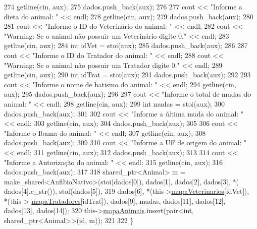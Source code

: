\begin{DoxyCode}
274         getline(cin, aux);
275         dados.push\_back(aux);
276 
277         cout << \textcolor{stringliteral}{"Informe a dieta do animal: "} << endl;
278         getline(cin, aux);
279         dados.push\_back(aux);
280 
281         cout << \textcolor{stringliteral}{"Informe o ID do Veterinário do animal: "} << endl;
282         cout << \textcolor{stringliteral}{"Warning: Se o animal não possuir um Veterinário digite 0."} << endl;
283         getline(cin, aux);
284         \textcolor{keywordtype}{int} idVet = stoi(aux);
285         dados.push\_back(aux);
286 
287         cout << \textcolor{stringliteral}{"Informe o ID do Tratador do animal: "} << endl;
288         cout << \textcolor{stringliteral}{"Warning: Se o animal não possuir um Tratador digite 0."} << endl;
289         getline(cin, aux);
290         \textcolor{keywordtype}{int} idTrat = stoi(aux);
291         dados.push\_back(aux);
292 
293         cout << \textcolor{stringliteral}{"Informe o nome de batismo do animal: "} << endl;
294         getline(cin, aux);
295         dados.push\_back(aux);
296 
297         cout << \textcolor{stringliteral}{"Informe o total de mudas do animal: "} << endl;
298         getline(cin, aux);
299         \textcolor{keywordtype}{int} mudas = stoi(aux);
300         dados.push\_back(aux);
301 
302         cout << \textcolor{stringliteral}{"Informe a última muda do animal: "} << endl;
303         getline(cin, aux);
304         dados.push\_back(aux);
305 
306         cout << \textcolor{stringliteral}{"Informe o Ibama do animal: "} << endl;
307         getline(cin, aux);
308         dados.push\_back(aux);
309 
310         cout << \textcolor{stringliteral}{"Informe a UF de origem do animal: "} << endl;
311         getline(cin, aux);
312         dados.push\_back(aux);
313 
314         cout << \textcolor{stringliteral}{"Informe a Autorização do animal: "} << endl;
315         getline(cin, aux);
316         dados.push\_back(aux);
317 
318         shared\_ptr<Animal> m = make\_shared<AnfibioNativo>(stoi(dados[0]), dados[1], dados[2], dados[3], *(
      dados[4].c\_str()), stof(dados[5]),
319                     dados[6], *(this->\hyperlink{classPetFera_a2bed2112a627bbdb3c0338654330a1ab}{mapaVeterinarios}[idVet]), *(this->
      \hyperlink{classPetFera_ac85920fc6c1471743838e6fe4444304d}{mapaTratadores}[idTrat]), dados[9], mudas, dados[11], dados[12], dados[13], dados[14]);
320         this->\hyperlink{classPetFera_ab0ba5fe6332bcffdabb7b03001280697}{mapaAnimais}.insert(pair<\textcolor{keywordtype}{int}, shared\_ptr<Animal>>(\textcolor{keywordtype}{id}, m));
321 
322     \}

\end{DoxyCode}
